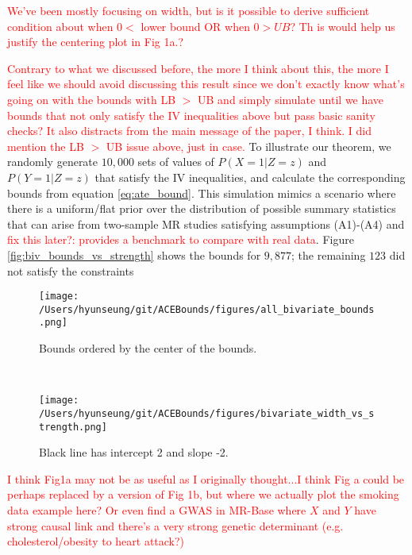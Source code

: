\documentclass[
]{article}
\theoremstyle{plain}
\begin{document}
\textcolor{red}{We've been mostly focusing on width, but is it possible to derive sufficient condition about when $0 <$ lower bound OR when $0> UB$? Th is would help us justify the centering plot in Fig 1a.?}

\textcolor{red}{Contrary to what we discussed before, the more I think about this, the more I feel like we should avoid discussing this result since we don't exactly know what's going on with the bounds with LB $>$ UB and simply simulate until we have bounds that not only satisfy the IV inequalities above but pass basic sanity checks? It also distracts from the main message of the paper, I think. I did mention the LB $>$ UB issue above, just in case.}
To illustrate our theorem, we randomly generate \(10,000\) sets of values of \(P(X = 1 | Z = z)\) and \(P(Y = 1 | Z = z)\) that satisfy the IV inequalities, and calculate the corresponding bounds from equation \eqref{eq:ate_bound}. This simulation mimics a scenario where there is a uniform/flat prior over the distribution of possible summary statistics that can arise from two-sample MR studies satisfying assumptions (A1)-(A4)  and \textcolor{red}{fix this later?: provides a benchmark to compare with real data}. Figure \ref{fig:biv_bounds_vs_strength} shows the bounds for \(9,877\); the remaining \(123\) did not satisfy the constraints 
\begin{figure*}
  \centering
  \begin{subfigure}[t]{0.5\textwidth}
    \centering
    \texttt{[image: /Users/hyunseung/git/ACEBounds/figures/all\_bivariate\_bounds.png]}
    \caption{Bounds ordered by the center of the bounds.}
    \label{fig:all_biv_bounds}
  \end{subfigure}%
  ~
  \begin{subfigure}[t]{0.5\textwidth}
    \texttt{[image: /Users/hyunseung/git/ACEBounds/figures/bivariate\_width\_vs\_strength.png]}
    \caption{Black line has intercept 2 and slope -2.}
    \label{fig:biv_width_vs_strength}
  \end{subfigure}
  \caption{10,000 values for bivariate distributions were randomly generated such that no constraints were violated. Of these, 123 resulted in bounds where the lower bound was greater than the upper bounds. These have been removed from these plots.}
  \label{fig:biv_bounds_vs_strength}
\end{figure*}
\textcolor{red}{I think Fig1a may not be as useful as I originally thought...I think Fig a could be perhaps replaced by a version of Fig 1b, but where we actually plot the smoking data example here? Or even find a GWAS in MR-Base where $X$ and $Y$ have strong causal link and there's a very strong genetic determinant (e.g. cholesterol/obesity to heart attack?)}
\end{document}
